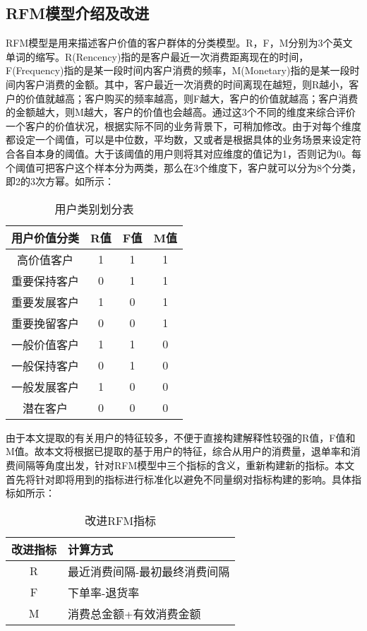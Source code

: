 \documentclass[lang=cn,11pt,a4paper,cite=authoryear]{elegantpaper}
\begin{document}
\subsection{RFM模型介绍及改进}
RFM模型是用来描述客户价值的客户群体的分类模型。R，F，M分别为3个英文单词的缩写。R(Rencency)指的是客户最近一次消费距离现在的时间，F(Frequency)指的是某一段时间内客户消费的频率，M(Monetary)指的是某一段时间内客户消费的金额。其中，客户最近一次消费的时间离现在越短，则R越小，客户的价值就越高；客户购买的频率越高，则F越大，客户的价值就越高；客户消费的金额越大，则M越大，客户的价值也会越高。通过这3个不同的维度来综合评价一个客户的价值状况，根据实际不同的业务背景下，可稍加修改。由于对每个维度都设定一个阈值，可以是中位数，平均数，又或者是根据具体的业务场景来设定符合各自本身的阈值。大于该阈值的用户则将其对应维度的值记为1，否则记为0。每个阈值可把客户这个样本分为两类，那么在3个维度下，客户就可以分为8个分类，即2的3次方幂。如所示：
\begin{center}
  \begin{longtable}{c|c|c|c}
    \caption{用户类别划分表}
    \label{用户类别划分表}\\
      \hline
      \textbf{用户价值分类} & \textbf{R值} & \textbf{F值} & \textbf{M值} \\
      \hline
      高价值客户 & 1 & 1 & 1 \\
      重要保持客户 & 0 & 1 & 1 \\
      重要发展客户 & 1 & 0 & 1 \\
      重要挽留客户 & 0 & 0 & 1 \\
      一般价值客户 & 1 & 1 & 0 \\
      一般保持客户 & 0 & 1 & 0 \\
      一般发展客户 & 1 & 0 & 0 \\
      潜在客户 & 0 & 0 & 0 \\
      \hline
  \end{longtable}
  \end{center}

由于本文提取的有关用户的特征较多，不便于直接构建解释性较强的R值，F值和M值。故本文将根据已提取的基于用户的特征，综合从用户的消费量，退单率和消费间隔等角度出发，针对RFM模型中三个指标的含义，重新构建新的指标。本文首先将针对即将用到的指标进行标准化以避免不同量纲对指标构建的影响。具体指标如所示：
\begin{center}
  \begin{longtable}{c|l}
    \caption{改进RFM指标}
    \label{改进指标}\\
    \hline
    \textbf{改进指标} & \textbf{计算方式} \\
    \hline
    R & 最近消费间隔-最初最终消费间隔 \\
    F & 下单率-退货率\\
    M & 消费总金额+有效消费金额 \\
    \hline
  \end{longtable}
\end{center}
\end{document}
